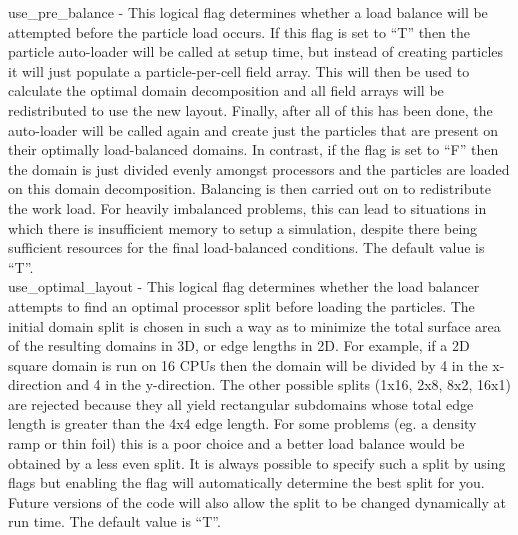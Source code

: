 {\emphtext use\_pre\_balance} - This logical flag determines whether a load
  balance will be attempted before the particle load occurs. If this flag is
  set to ``T'' then the particle auto-loader will be called at setup time, but
  instead of creating particles it will just populate a particle-per-cell field
  array. This will then be used to calculate the optimal domain decomposition
  and all field arrays will be redistributed to use the new layout. Finally,
  after all of this has been done, the auto-loader will be called again and
  create just the particles that are present on their optimally load-balanced
  domains. In contrast, if the flag is set to ``F'' then the domain is just
  divided evenly amongst processors and the particles are loaded on this domain
  decomposition. Balancing is then carried out on to redistribute the work load.
  For heavily imbalanced problems, this can lead to situations in which there is
  insufficient memory to setup a simulation, despite there being sufficient
  resources for the final load-balanced conditions. The default value is
  ``T''.\\

{\emphtext use\_optimal\_layout} - This logical flag determines whether the
  load balancer attempts to find an optimal processor split before loading
  the particles. The initial domain split is chosen in such a way as to
  minimize the total surface area of the resulting domains in 3D, or edge
  lengths in 2D. For example, if a 2D square domain is run on 16 CPUs then the
  domain will be divided by 4 in the x-direction and 4 in the y-direction. The
  other possible splits (1x16, 2x8, 8x2, 16x1) are rejected because they all
  yield rectangular subdomains whose total edge length is greater than the
  4x4 edge length. For some problems (eg. a density ramp or thin foil) this is
  a poor choice and a better load balance would be obtained by a less even
  split. It is always possible to specify such a split by using
   flags but enabling the
   flag will automatically determine the best
  split for you. Future versions of the code will also allow the split to be
  changed dynamically at run time.  The default value is ``T''.\\


